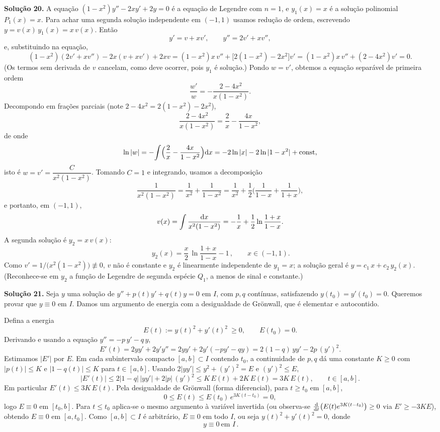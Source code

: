 \bigskip\noindent\textbf{Solução 20.}\quad
A equação $(1-x^2)y''-2xy'+2y=0$ é a equação de Legendre com $n=1$, e $y_1(x)=x$ é a solução polinomial $P_1(x)=x$. Para achar uma segunda solução independente em $(-1,1)$ usamos redução de ordem, escrevendo $y=v(x)\,y_1(x)=x\,v(x)$. Então
\[
y'=v+xv',\qquad y''=2v'+xv'',
\]
e, substituindo na equação,
\[
(1-x^2)(2v'+xv'')-2x(v+xv')+2xv
=(1-x^2)x\,v''+\big[2(1-x^2)-2x^2\big]v'
=(1-x^2)x\,v''+(2-4x^2)v'=0 .
\]
(Os termos sem derivada de $v$ cancelam, como deve ocorrer, pois $y_1$ é solução.) Pondo $w=v'$, obtemos a equação separável de primeira ordem
\[
\frac{w'}{w}=-\frac{2-4x^2}{x(1-x^2)} .
\]
Decompondo em frações parciais (note $2-4x^2=2(1-x^2)-2x^2$),
\[
\frac{2-4x^2}{x(1-x^2)}=\frac{2}{x}-\frac{4x}{1-x^2},
\]
de onde
\[
\ln|w|=-\!\int\!\Big(\frac{2}{x}-\frac{4x}{1-x^2}\Big)\mathrm{d} x
=-2\ln|x|-2\ln|1-x^2|+\text{const},
\]
isto é $w=v'=\dfrac{C}{x^2(1-x^2)}$. Tomando $C=1$ e integrando, usamos a decomposição
\[
\frac{1}{x^2(1-x^2)}=\frac{1}{x^2}+\frac{1}{1-x^2}=\frac{1}{x^2}+\frac12\Big(\frac{1}{1-x}+\frac{1}{1+x}\Big),
\]
e portanto, em $(-1,1)$,
\[
v(x)=\int\frac{\mathrm{d} x}{x^2(1-x^2)}=-\frac1x+\frac12\ln\frac{1+x}{1-x}.
\]
A segunda solução é $y_2=x\,v(x)$:
\[
\boxed{\,y_2(x)=\frac{x}{2}\,\ln\frac{1+x}{1-x}-1\,},\qquad x\in(-1,1).
\]
Como $v'=1/\big(x^2(1-x^2)\big)\not\equiv0$, $v$ não é constante e $y_2$ é linearmente independente de $y_1=x$; a solução geral é $y=c_1\,x+c_2\,y_2(x)$. (Reconhece-se em $y_2$ a função de Legendre de segunda espécie $Q_1$, a menos de sinal e constante.)


\bigskip\noindent\textbf{Solução 21.}\quad
Seja $y$ uma solução de $y''+p(t)y'+q(t)y=0$ em $I$, com $p,q$ contínuas, satisfazendo $y(t_0)=y'(t_0)=0$. Queremos provar que $y\equiv0$ em $I$. Damos um argumento de energia com a desigualdade de Grönwall, que é elementar e autocontido.

Defina a energia
\[
E(t):=y(t)^2+y'(t)^2\ \ge 0 ,\qquad E(t_0)=0 .
\]
Derivando e usando a equação $y''=-p\,y'-q\,y$,
\[
E'(t)=2yy'+2y'y''=2yy'+2y'(-py'-qy)=2(1-q)\,yy'-2p\,(y')^2 .
\]
Estimamos $|E'|$ por $E$. Em cada subintervalo compacto $[a,b]\subset I$ contendo $t_0$, a continuidade de $p,q$ dá uma constante $K\ge0$ com $|p(t)|\le K$ e $|1-q(t)|\le K$ para $t\in[a,b]$. Usando $2|yy'|\le y^2+(y')^2=E$ e $(y')^2\le E$,
\[
|E'(t)|\le 2|1-q|\,|yy'|+2|p|\,(y')^2\le K\,E(t)+2K\,E(t)=3K\,E(t),\qquad t\in[a,b].
\]
Em particular $E'(t)\le 3K\,E(t)$. Pela desigualdade de Grönwall (forma diferencial), para $t\ge t_0$ em $[a,b]$,
\[
0\le E(t)\le E(t_0)\,e^{3K(t-t_0)}=0 ,
\]
logo $E\equiv0$ em $[t_0,b]$. Para $t\le t_0$ aplica-se o mesmo argumento à variável invertida (ou observa-se $\tfrac{\mathrm{d}}{\mathrm{d} t}\big(E(t)e^{3K(t-t_0)}\big)\ge0$ via $E'\ge-3K E$), obtendo $E\equiv0$ em $[a,t_0]$. Como $[a,b]\subset I$ é arbitrário, $E\equiv0$ em todo $I$, ou seja $y(t)^2+y'(t)^2=0$, donde
\[
\boxed{\,y\equiv0\ \text{em }I\,}.
\]

